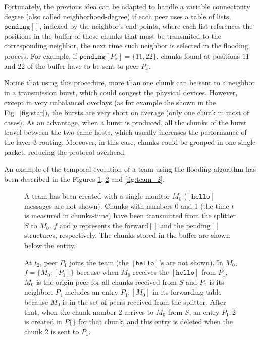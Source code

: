 Fortunately, the previous idea can be adapted to handle a variable
connectivity degree (also called \gls{neighborhood-degree}) if each
peer uses a table of lists, $\mathtt{pending}[]$, indexed by the
neighbor's end-points, where each list references the positions in the
buffer of those chunks that must be transmited to the corresponding
neighbor, the next time such neighbor is selected in the flooding
process. For example, if $\mathtt{pending}[P_x]=\{11,22\}$, chunks
found at positions $11$ and $22$ of the buffer have to be sent to peer
$P_x$.

Notice that using this procedure, more than one chunk can be sent to a
neighbor in a transmission burst, which could congest the physical
devices. However, except in very unbalanced overlays (as for example
the shown in the Fig.~\ref{fig:star}), the bursts are very short on
average (only one chunk in most of cases). As an advantage, when a
burst is produced, all the chunks of the burst travel between the two
same hosts, which usually increases the performance of the layer-3
routing. Moreover, in this case, chunks could be grouped in one single
packet, reducing the protocol overhead.

An example of the temporal evolution of a team using the flooding
algorithm has been described in the Figures \ref{fig:team_0},
\ref{fig:team_1} and \ref{fig:team_2}.

\begin{figure}
  \caption{A team has been created with a single monitor $M_0$
    ($[\mathtt{hello}]$ messages are not shown). Chunks with numbers 0
    and 1 (the time $t$ is measured in chunks-time) have been
    transmitted from the splitter $S$ to $M_0$. $f$ and $p$ represents
    the $\text{forward}[]$ and the $\text{pending}[]$ structures,
    respectively. The chunks stored in the buffer are shown below the
    entity.} %
  \label{fig:team_0}
\end{figure}

\begin{figure}
  \caption{At $t_2$, peer $P_1$ joins the team (the
    $[\mathtt{hello}]$'s are not shown). In $M_0$, $f=\{M_0:[P_1]\}$
    because when $M_0$ receives the $[\mathtt{hello}]$ from $P_1$,
    $M_0$ is the origin peer for all chunks received from $S$ and
    $P_1$ is its neighbor. $P_1$ includes an entry $P_1:[M_0]$ in its
    forwarding table because $M_0$ is in the set of peers received
    from the splitter. After that, when the chunk number 2 arrives to
    $M_0$ from $S$, an entry $P_1:2$ is created in $P\{\}$ for that
    chunk, and this entry is deleted when the chunk 2 is sent to
    $P_1$.} %
  \label{fig:team_1}
\end{figure}

